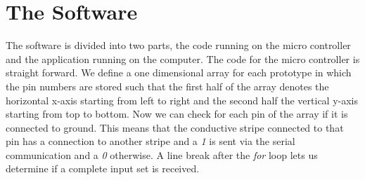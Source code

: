 \section{The Software}
The software is divided into two parts, the code running on the micro controller and the application running on the computer. The code for the micro controller is straight forward. We define a one dimensional array for each prototype in which the pin numbers are stored such that the first half of the array denotes the horizontal x-axis starting from left to right and the second half the vertical y-axis starting from top to bottom. Now we can check for each pin of the array if it is connected to ground. This means that the conductive stripe connected to that pin has a connection to another stripe and a \emph{1} is sent via the serial communication and a \emph{0} otherwise. A line break after the \emph{for} loop lets us determine if a complete input set is received.

